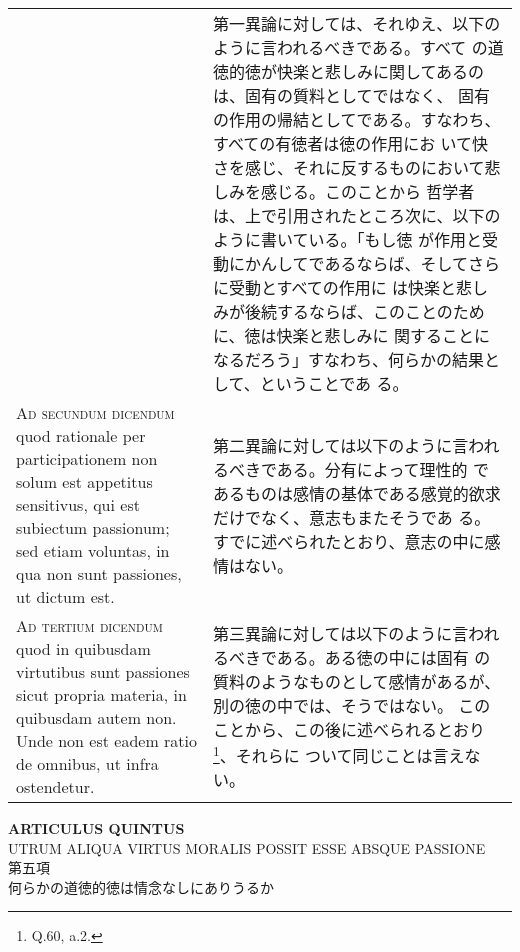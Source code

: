 \documentclass[10pt]{jsarticle}
\begin{document}
\begin{longtable}{p{21em}p{21em}}
&

 第一異論に対しては、それゆえ、以下のように言われるべきである。すべて
 の道徳的徳が快楽と悲しみに関してあるのは、固有の質料としてではなく、
 固有の作用の帰結としてである。すなわち、すべての有徳者は徳の作用にお
 いて快さを感じ、それに反するものにおいて悲しみを感じる。このことから
 哲学者は、上で引用されたところ次に、以下のように書いている。「もし徳
 が作用と受動にかんしてであるならば、そしてさらに受動とすべての作用に
 は快楽と悲しみが後続するならば、このことのために、徳は快楽と悲しみに
 関することになるだろう」すなわち、何らかの結果として、ということであ
 る。
 
\\


{\scshape Ad secundum dicendum} quod rationale per participationem non
solum est appetitus sensitivus, qui est subiectum passionum; sed etiam
voluntas, in qua non sunt passiones, ut dictum est.

&

 第二異論に対しては以下のように言われるべきである。分有によって理性的
 であるものは感情の基体である感覚的欲求だけでなく、意志もまたそうであ
 る。すでに述べられたとおり、意志の中に感情はない。
 
\\


{\scshape Ad tertium dicendum} quod in quibusdam virtutibus sunt
passiones sicut propria materia, in quibusdam autem non. Unde non est
eadem ratio de omnibus, ut infra ostendetur.

&

 第三異論に対しては以下のように言われるべきである。ある徳の中には固有
 の質料のようなものとして感情があるが、別の徳の中では、そうではない。
 このことから、この後に述べられるとおり\footnote{Q.60, a.2.}、それらに
 ついて同じことは言えない。


\end{longtable}
\newpage


\begin{center}
{\Large {\bf ARTICULUS QUINTUS}}\\
{\large UTRUM ALIQUA VIRTUS MORALIS POSSIT ESSE ABSQUE PASSIONE}\\
{\Large 第五項\\何らかの道徳的徳は情念なしにありうるか}
\end{center}
\end{document}
